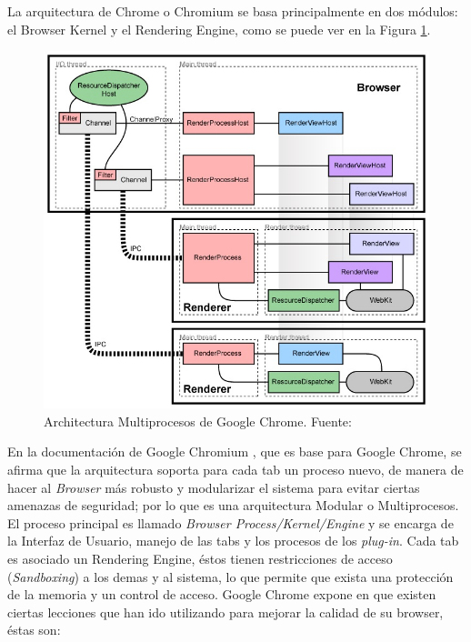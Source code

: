     La arquitectura de Chrome o Chromium se basa principalmente en dos módulos: el Browser Kernel y el Rendering Engine, como se puede ver en la Figura \ref{fig:archGC}.

    \begin{figure}[h!t]
        \centering
        \includegraphics[scale=0.65]{figures/archGC.jpg}
        \caption{Architectura Multiprocesos de Google Chrome. Fuente: \cite{multiProcGC}}
        \label{fig:archGC}
    \end{figure}

    En la documentación de Google Chromium \cite{multiProcGC}, que es base para Google Chrome, se afirma que la arquitectura soporta para cada tab un proceso nuevo, de manera de hacer al \textit{Browser} más robusto y modularizar el sistema para evitar ciertas amenazas de seguridad; por lo que es una arquitectura Modular o Multiprocesos. El proceso principal es llamado \textit{Browser Process/Kernel/Engine} y se encarga de la Interfaz de Usuario, manejo de las tabs y los procesos de los \textit{plug-in}. Cada tab es asociado un Rendering Engine, éstos tienen restricciones de acceso (\textit{Sandboxing}) a los demas y al sistema, lo que permite que exista una protección de la memoria y un control de acceso. Google Chrome expone en \cite{reis2009browser} que existen ciertas lecciones que han ido utilizando para mejorar la calidad de su browser, éstas son:

